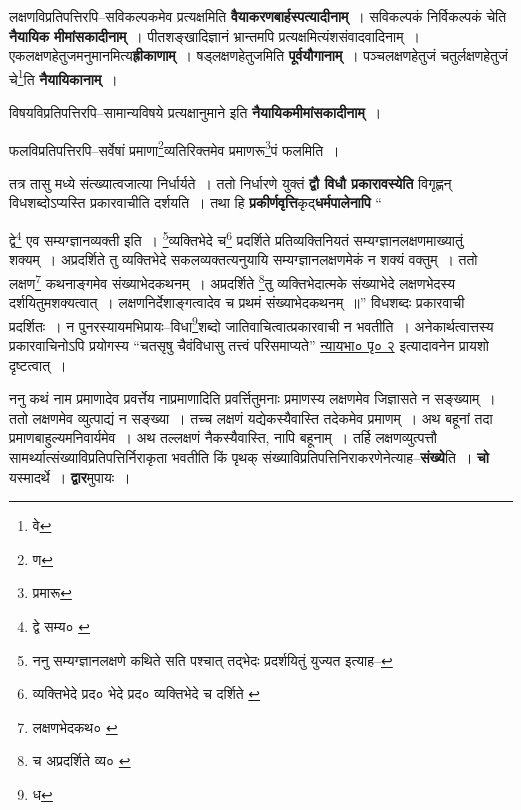 \documentclass[article,12pt,a4paper]{memoir}
\begin{document}
	  \pstart लक्षणविप्रतिपत्तिरपि--सविकल्पकमेव प्रत्यक्षमिति \textbf{वैयाकरणबार्हस्पत्यादीनाम्} । सविकल्पकं निर्विकल्पकं चेति \textbf{नैयायिक} \leavevmode{} \textbf{मीमांसकादीनाम्} । पीतशङ्खादिज्ञानं भ्रान्तमपि प्रत्यक्षमित्यंशसंवादवादिनाम् । एकलक्षणहेतुजमनुमानमित्य\textbf{ह्रीकाणाम्} । षड्लक्षणहेतुजमिति \textbf{पूर्वयौगानाम्} । पञ्चलक्षणहेतुजं चतुर्लक्षणहेतुजं चे\footnote{वे}ति \textbf{नैयायिकानाम्} ।
	\pend
      

	  \pstart विषयविप्रतिपत्तिरपि--सामान्यविषये प्रत्यक्षानुमाने इति \textbf{नैयायिकमीमांसकादीनाम्} ।
	\pend
      

	  \pstart फलविप्रतिपत्तिरपि--सर्वेषां प्रमाणा\footnote{ण}व्यतिरिक्तमेव प्रमाणरू\footnote{प्रमारू}पं फलमिति ।
	\pend
      

	  \pstart तत्र तासु मध्ये संत्ख्यात्वजात्या निर्धार्यते । ततो निर्धारणे युक्तं \textbf{द्वौ विधौ प्रकारावस्येति} विगृह्णन् विधशब्दोऽप्यस्ति प्रकारवाचीति दर्शयति । तथा हि \textbf{प्रकीर्णवृत्ति}कृद्\textbf{धर्मपालेनापि}  \leavevmode{} “
	  
	द्वे\footnote{द्वे सम्य० \cite{dp-msA} \cite{dp-edP} \cite{dp-edE}} एव सम्यग्ज्ञानव्यक्ती इति । \footnote{ननु सम्यग्ज्ञानलक्षणे कथिते सति पश्चात् तद्भेदः प्रदर्शयितुं युज्यत इत्याह--\cite{dp-msD-n}}व्यक्तिभेदे च\footnote{व्यक्तिभेदे प्रद० \cite{dp-msA} \cite{dp-edP} \cite{dp-edH} \cite{dp-edE} \cite{dp-edN} भेदे प्रद० \cite{dp-msB} व्यक्तिभेदे च दर्शिते \cite{dp-msD}} प्रदर्शिते प्रतिव्यक्तिनियतं सम्यग्ज्ञानलक्षणमाख्यातुं शक्यम् । अप्रदर्शिते तु व्यक्तिभेदे सकलव्यक्तत्यनुयायि सम्यग्ज्ञानलक्षणमेकं न शक्यं वक्तुम् । ततो लक्षण\footnote{लक्षणभेदकथ० \cite{dp-msA} \cite{dp-msB} \cite{dp-msD} \cite{dp-edP} \cite{dp-edH} \cite{dp-edE} \cite{dp-edN}} कथनाङ्गमेव संख्याभेदकथनम् । अप्रदर्शिते \footnote{च \cite{dp-msC} अप्रदर्शिते व्य० \cite{dp-msA} \cite{dp-edE}}तु व्यक्तिभेदात्मके संख्याभेदे लक्षणभेदस्य दर्शयितुमशक्यत्वात् । लक्षणनिर्देशाङ्गत्वादेव च प्रथमं संख्याभेदकथनम् ॥” विधशब्दः प्रकारवाची प्रदर्शितः । न पुनरस्यायमभिप्रायः--विधा\footnote{ध}शब्दो जातिवाचित्वात्प्रकारवाची न भवतीति । अनेकार्थत्वात्तस्य प्रकारवाचिनोऽपि प्रयोगस्य “चतसृषु चैवंविधासु तत्त्वं परिसमाप्यते” \href{http://http://sarit.indology.info/?cref=nbh.1.1.1_p3}{न्यायभा० पृ० २} इत्यादावनेन प्रायशो दृष्टत्वात् ।
	\pend
      

	  \pstart ननु कथं नाम प्रमाणादेव प्रवर्त्तेय नाप्रमाणादिति प्रवर्त्तितुमनाः प्रमाणस्य लक्षणमेव जिज्ञासते न सङ्ख्याम् । ततो लक्षणमेव व्युत्पाद्यं न सङ्ख्या । तच्च लक्षणं यद्येकस्यैवास्ति तदेकमेव प्रमाणम् । अथ बहूनां तदा प्रमाणबाहुल्यमनिवार्यमेव । अथ तल्लक्षणं नैकस्यैवास्ति, नापि बहूनाम् । तर्हि लक्षणव्युत्पत्तौ सामर्थ्यात्संख्याविप्रतिपत्तिर्निराकृता भवतीति किं पृथक् संख्याविप्रतिपत्तिनिराकरणेनेत्याह--\textbf{संख्ये}ति । \textbf{चो} यस्मादर्थे । \textbf{द्वार}मुपायः ।
	\pend
      
\end{document}
